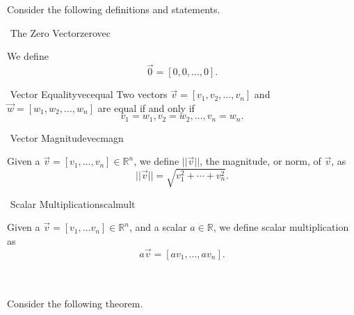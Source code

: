     \vphantom
    \pagebreak
    \\
    \\
    Consider the following definitions and statements.
    \begin{definition}{\Stop\,\,The Zero Vector}{zerovec}

        We define 
        \begin{equation*}
            \vec{0}=[0,0,\ldots,0].
        \end{equation*}
        
    \end{definition}
    \begin{definition}{\Stop\,\,Vector Equality}{vecequal}
        Two vectors \(\vec{v}=[v_1,v_2,\ldots,v_n]\) and \(\vec{w}=[w_1,w_2,\ldots,w_n]\) are equal if and only if
        \begin{equation*}
            v_1=w_1,v_2=w_2,\ldots,v_n=w_n.
        \end{equation*}
    \end{definition}
    \begin{definition}{\Stop\,\,Vector Magnitude}{vecmagn}

        Given a \(\vec{v}=[v_1,\ldots, v_n]\in\mathbb{R}^n\), we define \(||\vec{v}||\), the magnitude, or norm, of \(\vec{v}\), as
        \begin{equation*}
            ||\vec{v}||=\sqrt{v_1^2+\cdots+v_n^2}.
        \end{equation*}
        
    \end{definition}
    \begin{definition}{\Stop\,\,Scalar Multiplication}{scalmult}

        Given a \(\vec{v}=[v_1,\ldots v_n]\in\mathbb{R}^n\), and a scalar \(a\in\mathbb{R}\), we define scalar multiplication as
        \begin{equation*}
            a\vec{v}=[av_1,\ldots, av_n].
        \end{equation*}
        
    \end{definition}
    \vphantom
    \\
    \\
    Consider the following theorem.

